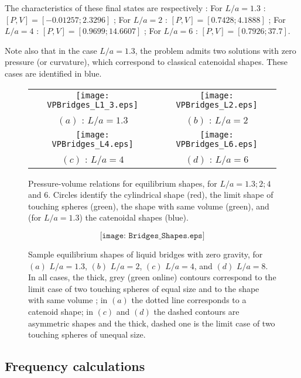 The characteristics of these final states are respectively :
For $L/a=1.3$ : $[P,V] = [ -0.01257;  2.3296]$ ; 
For $L/a= 2$ : $[P,V] = [ 0.7428 ;  4.1888 ]$ ; 
For $L/a = 4$ : $[P,V] = [  0.9699 ; 14.6607]$ ;
For $L/a= 6$ : $[P,V] = [0.7926 ; 37.7]$.

Note also that in the case $L/a = 1.3$, the problem admits two solutions with zero pressure (or curvature), which correspond to classical catenoidal shapes. These cases are identified in blue.
 




\begin{figure}
\begin{tabular}{cc}
\texttt{[image: VPBridges\_L1\_3.eps]} &
\texttt{[image: VPBridges\_L2.eps]} \\
$(a)$ : $L/a = 1.3$ & $(b)$ : $L/a = 2$ \\
\texttt{[image: VPBridges\_L4.eps]} & 
\texttt{[image: VPBridges\_L6.eps]} \\
$(c)$ : $L/a = 4$ & $(d)$ : $L/a = 6$ \\
\end{tabular}
\caption{Pressure-volume relations for equilibrium shapes, for $L/a= 1.3; 2; 4$ and $6$. Circles identify the cylindrical shape (red), the limit shape of touching spheres (green), the shape with same volume (green), and (for $L/a= 1.3$) the catenoidal shapes (blue). }
\end{figure}

\begin{figure}
$$
\texttt{[image: Bridges\_Shapes.eps]}
$$
\caption{Sample equilibrium shapes of liquid bridges with zero gravity, 
for $(a)$ $L/a= 1.3$, $(b)$ $L/a=2$, $(c)$ $L/a=4$, and $(d)$ $L/a=8$.
In all cases, the thick, grey (green online) contours correspond to the limit case of two touching spheres of equal size and to the shape with same volume ; in $(a)$ the dotted line corresponds to  a catenoid shape;
in $(c)$ and $(d)$ the dashed contours are asymmetric shapes and the thick, dashed one is the limit case of two touching spheres of unequal size. }
\end{figure}



\subsection{Frequency calculations}


